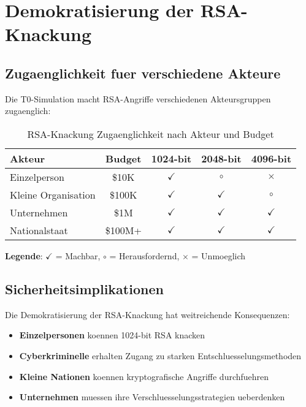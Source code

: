 \documentclass[12pt,a4paper]{article}
\begin{document}
	\section{Demokratisierung der RSA-Knackung}
	
	\subsection{Zugaenglichkeit fuer verschiedene Akteure}
	
	Die T0-Simulation macht RSA-Angriffe verschiedenen Akteursgruppen zugaenglich:
	
	\begin{table}[htbp]
		\centering
		\begin{tabular}{lcccc}
			\toprule
			\textbf{Akteur} & \textbf{Budget} & \textbf{1024-bit} & \textbf{2048-bit} & \textbf{4096-bit} \\
			\midrule
			\rowcolor{red!30} Einzelperson & \$10K & $\checkmark$ & $\circ$ & $\times$ \\
			\rowcolor{orange!30} Kleine Organisation & \$100K & $\checkmark$ & $\checkmark$ & $\circ$ \\
			\rowcolor{yellow!30} Unternehmen & \$1M & $\checkmark$ & $\checkmark$ & $\checkmark$ \\
			\rowcolor{green!30} Nationalstaat & \$100M+ & $\checkmark$ & $\checkmark$ & $\checkmark$ \\
			\bottomrule
		\end{tabular}
		\caption{RSA-Knackung Zugaenglichkeit nach Akteur und Budget}
		\label{tab:accessibility}
	\end{table}
	
	\textbf{Legende}: $\checkmark$ = Machbar, $\circ$ = Herausfordernd, $\times$ = Unmoeglich
	
	\subsection{Sicherheitsimplikationen}
	
	Die Demokratisierung der RSA-Knackung hat weitreichende Konsequenzen:
	
	\begin{itemize}
		\item \textbf{Einzelpersonen} koennen 1024-bit RSA knacken
		\item \textbf{Cyberkriminelle} erhalten Zugang zu starken Entschluesselungsmethoden
		\item \textbf{Kleine Nationen} koennen kryptografische Angriffe durchfuehren
		\item \textbf{Unternehmen} muessen ihre Verschluesselungsstrategien ueberdenken
	\end{itemize}
	
\end{document}
